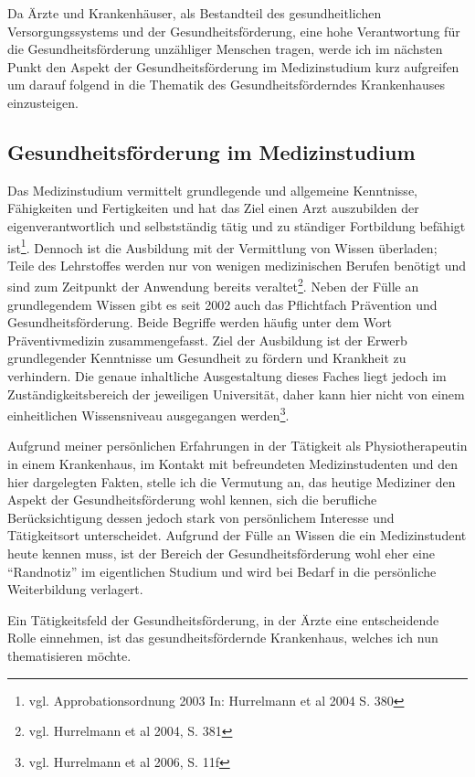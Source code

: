 Da Ärzte und Krankenhäuser, als Bestandteil des gesundheitlichen Versorgungssystems und der Gesundheitsförderung, eine hohe Verantwortung für die Gesundheitsförderung unzähliger Menschen tragen, werde ich im nächsten Punkt den Aspekt der Gesundheitsförderung im Medizinstudium kurz aufgreifen um darauf folgend in die Thematik des Gesundheitsförderndes Krankenhauses einzusteigen.

\subsection{Gesundheitsförderung im Medizinstudium}
\label{sec:GesundheitsförderungImMedizinstudium}

Das Medizinstudium vermittelt  grundlegende und allgemeine Kenntnisse, Fähigkeiten und Fertigkeiten und hat das Ziel einen Arzt auszubilden der eigenverantwortlich und selbstständig tätig und zu ständiger Fortbildung befähigt ist\footnote{vgl. Approbationsordnung 2003 In: Hurrelmann et al 2004 S. 380}. Dennoch ist die Ausbildung mit der Vermittlung von Wissen überladen; Teile des Lehrstoffes werden nur von wenigen medizinischen Berufen benötigt und sind zum Zeitpunkt der Anwendung bereits veraltet\footnote{vgl. Hurrelmann et al 2004, S. 381}. Neben der Fülle an grundlegendem Wissen gibt es seit 2002 auch das Pflichtfach Prävention und Gesundheitsförderung. Beide Begriffe werden häufig unter dem Wort Präventivmedizin zusammengefasst. Ziel der Ausbildung ist der Erwerb grundlegender Kenntnisse um Gesundheit zu fördern und Krankheit zu verhindern. Die genaue inhaltliche Ausgestaltung dieses Faches liegt jedoch im Zuständigkeitsbereich der jeweiligen Universität, daher kann hier nicht von einem einheitlichen Wissensniveau ausgegangen werden\footnote{vgl. Hurrelmann et al 2006, S. 11f}. 

Aufgrund meiner persönlichen Erfahrungen in der Tätigkeit als Physiotherapeutin in einem Krankenhaus, im Kontakt mit befreundeten Medizinstudenten und den hier dargelegten Fakten, stelle ich die Vermutung an, das heutige Mediziner den Aspekt der Gesundheitsförderung wohl kennen, sich die berufliche Berücksichtigung dessen jedoch stark von persönlichem Interesse und Tätigkeitsort unterscheidet. Aufgrund der Fülle an Wissen die ein Medizinstudent heute kennen muss, ist der Bereich der Gesundheitsförderung wohl eher eine "`Randnotiz"' im eigentlichen Studium und wird bei Bedarf in die persönliche Weiterbildung verlagert. 

Ein Tätigkeitsfeld der Gesundheitsförderung, in der Ärzte eine entscheidende Rolle einnehmen, ist das gesundheitsfördernde Krankenhaus, welches ich nun thematisieren möchte.

